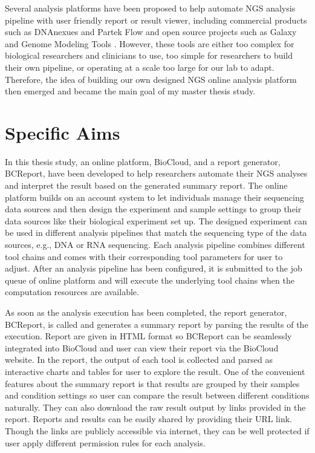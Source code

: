 Several analysis platforms have been proposed to help automate NGS analysis
pipeline with user friendly report or result viewer, including commercial
products such as DNAnexues \cite{:dnanexus} and Partek Flow \cite{:partek} and
open source projects such as Galaxy \cite{goecks2010:galaxy} and Genome
Modeling Tools \cite{griffith2015:genome}. However, these tools are either too
complex for biological researchers and clinicians to use, too simple for
researchers to build their own pipeline, or operating at a scale too large for
our lab to adapt. Therefore, the idea of building our own designed NGS online
analysis platform then emerged and became the main goal of my master thesis
study.


\section{Specific Aims}
\label{s:specific-aim}

%
%

In this thesis study, an online platform, BioCloud, and a report generator,
BCReport, have been developed to help researchers automate their NGS analyses
and interpret the result based on the generated summary report. The online
platform builds on an account system to let individuals manage their sequencing
data sources and then design the experiment and sample settings to group their
data sources like their biological experiment set up. The designed experiment
can be used in different analysis pipelines that match the sequencing type of
the data sources, e.g., DNA or RNA sequencing. Each analysis pipeline combines
different tool chains and comes with their corresponding tool parameters for
user to adjust. After an analysis pipeline has been configured, it is submitted
to the job queue of online platform and will execute the underlying tool chains
when the computation resources are available.

As soon as the analysis execution has been completed, the report generator,
BCReport, is called and generates a summary report by parsing the results of
the execution. Report are given in HTML format so BCReport can be seamlessly
integrated into BioCloud and user can view their report via the BioCloud
website. In the report, the output of each tool is collected and parsed as
interactive charts and tables for user to explore the result. One of the
convenient features about the summary report is that results are grouped by
their samples and condition settings so user can compare the result between
different conditions naturally. They can also download the raw result output by
links provided in the report. Reports and results can be easily shared by
providing their URL link. Though the links are publicly accessible via
internet, they can be well protected if user apply different permission rules
for each analysis.



